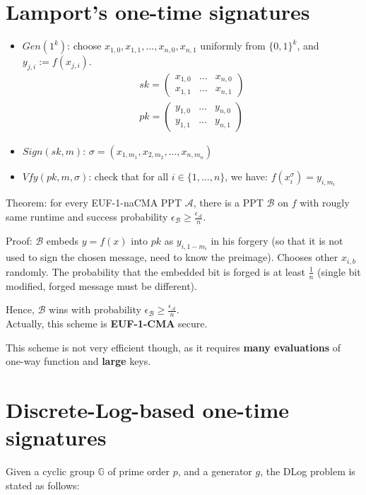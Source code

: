 \documentclass[oneside]{book}
\newcommand{\G}[0]{\mathbb{G}}
\newcommand{\cA}[0]{\mathcal{A}}
\newcommand{\cB}[0]{\mathcal{B}}
\begin{document}
\section{Lamport's one-time signatures}
\begin{itemize}
    \item $Gen(1^k)$: choose $x_{1,0}, x_{1,1}, ..., x_{n,0}, x_{n,1}$ uniformly from $\{0,1\}^k$, and $y_{j,i} := f(x_{j,i})$.
    \begin{align}
        sk = \begin{pmatrix}
x_{1,0} & ... & x_{n,0}\\
x_{1,1} & ... & x_{n,1}
\end{pmatrix}\\
pk = \begin{pmatrix}
y_{1,0} & ... & y_{n,0}\\
y_{1,1} & ... & y_{n,1}
\end{pmatrix}
    \end{align}
    \item $Sign(sk, m)$: $\sigma = (x_{1,m_1}, x_{2,m_2}, ..., x_{n,m_n})$
    
    \item $Vfy(pk, m, \sigma)$: check that for all $i \in \{1, ..., n\}$, we have: $f(x_i^\sigma) = y_{i,m_i}$
\end{itemize}

Theorem: for every EUF-1-naCMA PPT $\cA$, there is a PPT $\cB$ on $f$ with rougly same runtime and success probability $\epsilon_\cB \ge \frac{\epsilon_\cA}{n}$.

Proof: $\cB$ embeds $y = f(x)$ into $pk$ as $y_{i,1-m_i}$ in his forgery (so that it is not used to sign the chosen message, need to know the preimage). Chooses other $x_{i,b}$ randomly.
The probability that the embedded bit is forged is at least $\frac{1}{n}$ (single bit modified, forged message must be different).

Hence, $\cB$ wins with probability $\epsilon_\cB \ge \frac{\epsilon_\cA}{n}$.\\

Actually, this scheme is \textbf{EUF-1-CMA} secure.

This scheme is not very efficient though, as it requires \textbf{many evaluations} of one-way function and \textbf{large} keys.

\section{Discrete-Log-based one-time signatures}
Given a cyclic group $\G$ of prime order $p$, and a generator $g$, the DLog problem is stated as follows:
\end{document}
